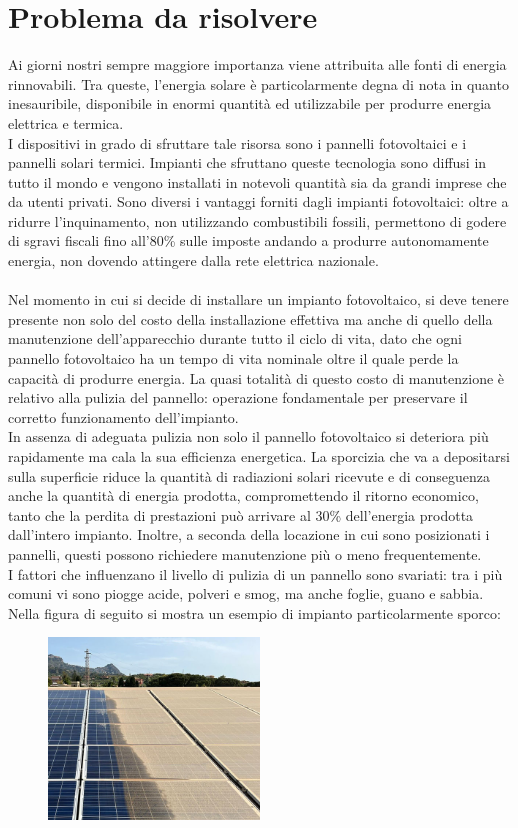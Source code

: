 \documentclass[a4paper, 12pt]{article}
\begin{document}
	\section{Problema da risolvere}
	Ai giorni nostri sempre maggiore importanza viene attribuita alle fonti di energia rinnovabili. Tra queste, l'energia solare è particolarmente degna di nota in quanto inesauribile, disponibile in enormi quantità ed utilizzabile per produrre energia elettrica e termica.\\
	I dispositivi in grado di sfruttare tale risorsa sono i pannelli fotovoltaici e i pannelli solari termici. Impianti che sfruttano queste tecnologia sono diffusi in tutto il mondo e vengono installati in notevoli quantità sia da grandi imprese che da utenti privati. Sono diversi i vantaggi forniti dagli impianti fotovoltaici: oltre a ridurre l'inquinamento, non utilizzando combustibili fossili, permettono di godere di sgravi fiscali fino all'80\% sulle imposte andando a produrre autonomamente energia, non dovendo attingere dalla rete elettrica nazionale.\\\\
	Nel momento in cui si decide di installare un impianto fotovoltaico, si deve tenere presente non solo del costo della installazione effettiva ma anche di quello della manutenzione dell'apparecchio durante tutto il ciclo di vita, dato che ogni pannello fotovoltaico ha un tempo di vita nominale oltre il quale perde la capacità di produrre energia. La quasi totalità di questo costo di manutenzione è relativo alla pulizia del pannello: operazione fondamentale per preservare il corretto funzionamento dell'impianto.\\
	In assenza di adeguata pulizia non solo il pannello fotovoltaico si deteriora più rapidamente ma cala la sua efficienza energetica. La sporcizia che va a depositarsi sulla superficie riduce la quantità di radiazioni solari ricevute e di conseguenza anche la quantità di energia prodotta, compromettendo il ritorno economico, tanto che la perdita di prestazioni può arrivare al 30\% dell'energia prodotta dall'intero impianto. Inoltre, a seconda della locazione in cui sono posizionati i pannelli, questi possono richiedere manutenzione più o meno frequentemente.\\
	I fattori che influenzano il livello di pulizia di un pannello sono svariati: tra i più comuni vi sono piogge acide, polveri e smog, ma anche foglie, guano e sabbia. Nella figura di seguito si mostra un esempio di impianto particolarmente sporco:
	\begin{figure}[h]
		\centering\includegraphics[width=0.5\textwidth]{Images/pannelli_sporchi2.jpg}
	\end{figure}\\
\end{document}
